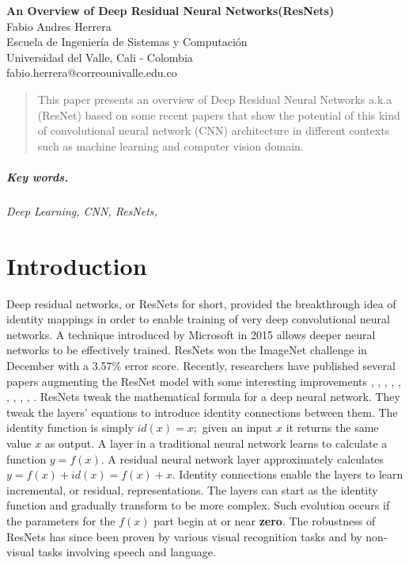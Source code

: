 \documentclass[12pt]{article}
\numberwithin{equation}{section}
\numberwithin{table}{section}
\numberwithin{figure}{section}
\begin{document}

\begin{center}
\textbf{\Large An Overview of Deep Residual Neural Networks\newline(ResNets)} \\[6pt]
  Fabio Andres Herrera \\[6pt]
  Escuela de Ingeniería de Sistemas y Computación\\
  Universidad del Valle, Cali - Colombia  \\[6pt]
  fabio.herrera@correounivalle.edu.co
\end{center}

\begin{abstract}

\noindent	
This paper presents an overview of Deep Residual Neural Networks a.k.a (ResNet) based on some recent papers that show the potential of this kind of convolutional neural network (CNN) architecture in different contexts such as machine learning and computer vision domain.

\end{abstract}

\subparagraph{\textit{Key words.}}\textit{ Deep Learning, CNN, ResNets, }



\section{Introduction}

Deep residual networks, or ResNets for short, provided the breakthrough idea of identity mappings in order to enable training of very deep convolutional neural networks. A technique introduced by Microsoft in 2015 allows deeper neural networks to be effectively trained. ResNets won the ImageNet challenge \cite{ILSVRC15} in December with a 3.57\% error score. Recently, researchers have published several papers augmenting the ResNet model with some interesting improvements \cite{He2016}, \cite{Veit2016}, \cite{Wu2017}, \cite{Xie2016} , \cite{Zagoruyko2016}, \cite{Long2016}
, \cite{Huang2016}, \cite{Philipp2017} , \cite{Targ2016} , \cite{Wang2017}. ResNets tweak the mathematical formula for a deep neural network. They tweak the layers’ equations to introduce identity connections between them. The identity function is simply $id(x) = x;$ given an input $x$ it returns the same value $x$ as output. A layer in a traditional neural network learns to calculate a function $y = f(x)$. A residual neural network layer approximately calculates $y = f(x) + id(x) = f(x) + x$. Identity connections enable the layers to learn incremental, or residual, representations. The layers can start as the identity function and gradually transform to be more complex. Such evolution occurs if the parameters for the $f(x)$ part begin at or near \textbf{zero}. The robustness of ResNets has since been proven by various visual recognition tasks and by non-visual tasks involving speech and language\cite{Michael:Online}.
\end{document}
